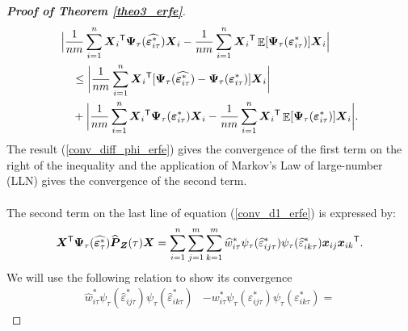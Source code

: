 \documentclass[15pt,a4paper]{article}
\DeclareMathOperator{\E}{\mathbb{E}}
\newcommand{\transpose}{{}^{\text{\sffamily T}}}
\begin{document}
\begin{proof}[\textbf{Proof of Theorem \ref{theo3_erfe}}]
\begin{align}
\begin{split}
& \Big\lvert \frac{1}{nm}\sum_{i=1}^{n}\boldsymbol{X}_i\transpose\boldsymbol{\Psi}_{\tau}(\widehat{\boldsymbol{\varepsilon}^{*}_{i\tau}}) \boldsymbol{X}_i - \frac{1}{nm}\sum_{i=1}^{n}\boldsymbol{X}_i\transpose
\E[\boldsymbol{\Psi}_{\tau}(\boldsymbol{\varepsilon}^{*}_{i\tau})]\boldsymbol{X}_i \Big\rvert \\
& \quad \leq    \bigg\lvert \frac{1}{nm}\sum_{i=1}^{n}\boldsymbol{X}_i\transpose[\boldsymbol{\Psi}_{\tau}(\widehat{\boldsymbol{\varepsilon}^{*}_{i\tau}})-\boldsymbol{\Psi}_{\tau}(\boldsymbol{\varepsilon}^{*}_{i\tau})] \boldsymbol{X}_i\bigg\rvert \\
& \quad  + \bigg\lvert\frac{1}{nm} \sum_{i=1}^{n}\boldsymbol{X}_i\transpose\boldsymbol{\Psi}_{\tau}(\boldsymbol{\varepsilon}^{*}_{i\tau})\boldsymbol{X}_i-\frac{1}{nm}\sum_{i=1}^{n}\boldsymbol{X}_i\transpose
\E[\boldsymbol{\Psi}_{\tau}(\boldsymbol{\varepsilon}^{*}_{i\tau})]\boldsymbol{X}_i\bigg \rvert.\\
\end{split}
\end{align}
The result (\ref{conv_diff_phi_erfe}) gives the convergence of the first term on the right of the inequality and the application of Markov's Law of large-number (LLN) gives the convergence of the second term.
 ~~\\
 ~~\\
The second term on the last line of equation (\ref{conv_d1_erfe}) is expressed by:
 \begin{equation}\label{second_d1_erfe}
     \boldsymbol{X}\transpose\boldsymbol{\Psi}_{\tau}(\widehat{\boldsymbol{\varepsilon}_{\tau}^{*}})\widehat{\boldsymbol{P}}_{\boldsymbol{Z}}(\tau)\boldsymbol{X} =
     \sum_{i=1}^{n}\sum_{j=1}^{m}\sum_{k=1}^{m}\widehat{w}^{*}_{i\tau}\psi_{\tau}(\widehat{\varepsilon}^{*}_{ij\tau})\psi_{\tau}(\widehat{\varepsilon}^{*}_{ik\tau})\boldsymbol{x}_{ij}\boldsymbol{x}_{ik}\transpose.
\end{equation}
We will use the following relation to show its convergence
\begin{equation}\label{second_d1_term_conv_inter_erfe}
\begin{split}
\widehat{w}^{*}_{i\tau}\psi_{\tau}(\widehat{\varepsilon}^{*}_{ij\tau})\psi_{\tau}(\widehat{\varepsilon}^{*}_{ik\tau}) & -w^{*}_{i\tau}\psi_{\tau}(\varepsilon^{*}_{ij\tau})\psi_{\tau}(\varepsilon^{*}_{ik\tau}) =

\end{split}
\end{equation}
\end{proof}
\end{document}
